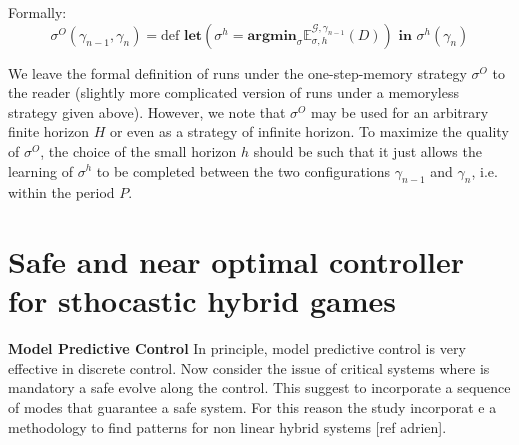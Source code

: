     Formally:
    \begin{equation*}
        \sigma^O (\gamma_{n-1},\gamma_{n}) = \text{def } \textbf{let}(\sigma^h = \textbf{argmin}_{\sigma}\mathbb{E}^{\mathcal{G},\gamma_{n-1}}_{\sigma,h}(D) ) \textbf{ in } \sigma^h(\gamma_n) 
    \end{equation*}

    We leave the formal definition of runs under the one-step-memory strategy $\sigma^O$
    to the reader (slightly more complicated version of runs under a memoryless strategy given above).
    However, we note that $\sigma^O$ may be used for an arbitrary finite horizon $H$ or 
    even as a strategy of infinite horizon. To maximize the quality of $\sigma^O$, the choice
    of the small horizon $h$ should be such that it just allows the learning of $\sigma^h$
    to be completed between the two configurations $\gamma_{n-1}$ and $\gamma_n$, i.e.
    within the period $P$.

    \clearpage


\section{Safe and near optimal controller for sthocastic hybrid games}
    \textbf{Model Predictive Control} 
    In principle, model predictive control is very effective in discrete control.
    Now consider the issue of critical systems where is mandatory a safe evolve 
    along the control. This suggest to incorporate a sequence of modes that guarantee
    a safe system. For this reason the study incorporat e a methodology to find patterns
    for non linear hybrid systems [ref adrien].
    \clearpage
